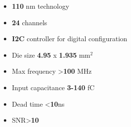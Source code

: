 \documentclass[aspectratio=169]{beamer}
\begin{document}
\begin{frame}
\begin{columns}
\begin{columns}
			\begin{itemize}
				\item \textbf{110} nm technology
				\item \textbf{24} channels
				\item \textbf{I2C} controller for digital configuration
				\item Die size \textbf{4.95 }x \textbf{1.935} mm$^2$
				\item Max frequency >\textbf{100} MHz
				\item Input capacitance \textbf{3-140} fC
				\item Dead time <\textbf{10}ns
				\item SNR>\textbf{10}
			\end{itemize}
		\end{columns}
		
	\end{columns}
	\end{frame}
\end{document}
